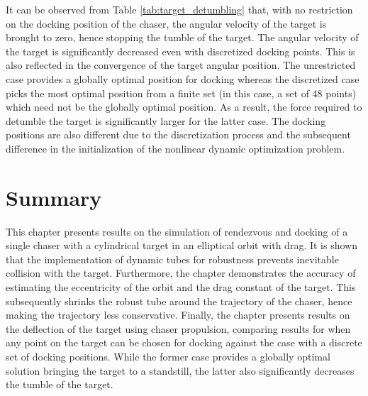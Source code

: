 It can be observed from Table \ref{tab:target_detumbling} that, with no restriction on the docking position of the chaser, the angular velocity of the target is brought to zero, hence stopping the tumble of the target.
The angular velocity of the target is significantly decreased even with discretized docking points.
This is also reflected in the convergence of the target angular position.
The unrestricted case provides a globally optimal position for docking whereas the discretized case picks the most optimal position from a finite set (in this case, a set of 48 points) which need not be the globally optimal position.
As a result, the force required to detumble the target is significantly larger for the latter case.
The docking positions are also different due to the discretization process and the subsequent difference in the initialization of the nonlinear dynamic optimization problem.
\section{Summary}
This chapter presents results on the simulation of rendezvous and docking of a single chaser with a cylindrical target in an elliptical orbit with drag.
It is shown that the implementation of dynamic tubes for robustness prevents inevitable collision with the target. 
Furthermore, the chapter demonstrates the accuracy of estimating the eccentricity of the orbit and the drag constant of the target.
This subsequently shrinks the robust tube around the trajectory of the chaser, hence making the trajectory less conservative.
Finally, the chapter presents results on the deflection of the target using chaser propulsion, comparing results for when any point on the target can be chosen for docking against the case with a discrete set of docking positions.
While the former case provides a globally optimal solution bringing the target to a standstill, the latter also significantly decreases the tumble of the target.


